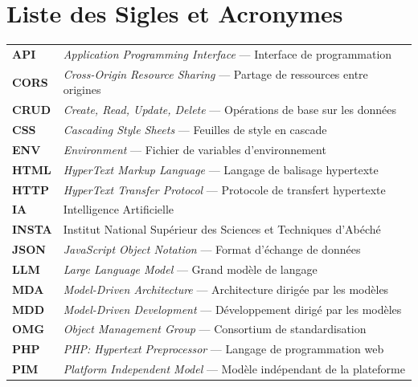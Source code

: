 \chapter*{Liste des Sigles et Acronymes}

\vspace*{0.5cm}

\begin{tabular}{ll}
\textbf{API} & \textit{Application Programming Interface} — Interface de programmation \\[6pt]
\textbf{CORS} & \textit{Cross-Origin Resource Sharing} — Partage de ressources entre origines \\[6pt]
\textbf{CRUD} & \textit{Create, Read, Update, Delete} — Opérations de base sur les données \\[6pt]
\textbf{CSS} & \textit{Cascading Style Sheets} — Feuilles de style en cascade \\[6pt]
\textbf{ENV} & \textit{Environment} — Fichier de variables d'environnement \\[6pt]
\textbf{HTML} & \textit{HyperText Markup Language} — Langage de balisage hypertexte \\[6pt]
\textbf{HTTP} & \textit{HyperText Transfer Protocol} — Protocole de transfert hypertexte \\[6pt]
\textbf{IA} & Intelligence Artificielle \\[6pt]
\textbf{INSTA} & Institut National Supérieur des Sciences et Techniques d'Abéché \\[6pt]
\textbf{JSON} & \textit{JavaScript Object Notation} — Format d'échange de données \\[6pt]
\textbf{LLM} & \textit{Large Language Model} — Grand modèle de langage \\[6pt]
\textbf{MDA} & \textit{Model-Driven Architecture} — Architecture dirigée par les modèles \\[6pt]
\textbf{MDD} & \textit{Model-Driven Development} — Développement dirigé par les modèles \\[6pt]
\textbf{OMG} & \textit{Object Management Group} — Consortium de standardisation \\[6pt]
\textbf{PHP} & \textit{PHP: Hypertext Preprocessor} — Langage de programmation web \\[6pt]
\textbf{PIM} & \textit{Platform Independent Model} — Modèle indépendant de la plateforme \\[6pt]

\end{tabular}
